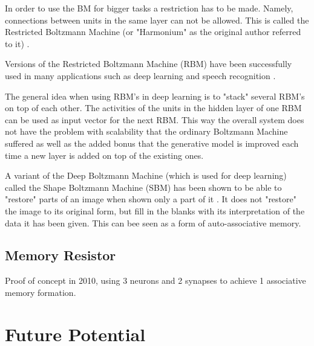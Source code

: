 \documentclass[12pt, a4paper]{article}
\begin{document}
In order to use the BM for bigger tasks a restriction has to be made. Namely, connections between units in the same layer can not be allowed. This is called the Restricted Boltzmann Machine (or "Harmonium" as the original author referred to it) \cite{smolensky1986information}.

Versions of the Restricted Boltzmann Machine (RBM) have been successfully used in many applications such as deep learning \cite{hinton2012better} and speech recognition \cite{dahl2010phone}.

The general idea when using RBM's in deep learning is to "stack" several RBM's on top of each other. The activities of the units in the hidden layer of one RBM can be used as input vector for the next RBM. This way the overall system does not have the problem with scalability that the ordinary Boltzmann Machine suffered as well as the added bonus that the generative model is improved each time a new layer is added on top of the existing ones.

A variant of the Deep Boltzmann Machine \cite{salakhutdinov2009deep} (which is used for deep learning) called the Shape Boltzmann Machine (SBM) has been shown to be able to "restore" parts of an image when shown only a part of it \cite{eslami2014shape}. It does not "restore" the image to its original form, but fill in the blanks with its interpretation of the data it has been given. This can bee seen as a form of auto-associative memory.

\subsection{Memory Resistor}


Proof of concept in 2010, using 3 neurons and 2 synapses to achieve 1 associative memory formation.

%


\section{Future Potential}

%
%
\end{document}
